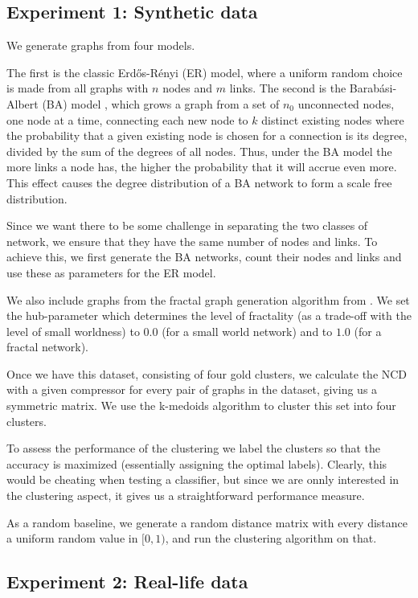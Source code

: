 \documentclass{article}
\begin{document}
\subsection*{Experiment 1: Synthetic data}

We generate graphs from four models. 

The first is the classic Erd\H{o}s-R\'enyi (ER) model, where a uniform random choice is made from all graphs with $n$ nodes and $m$ links. The second is the Barab\'asi-Albert (BA) model \cite{albert2002statistical}, which grows a graph from a set of $n_0$ unconnected nodes, one node at a time, connecting each new node to $k$ distinct existing nodes where the probability that a given existing node is chosen for a connection is its degree, divided by the sum of the degrees of all nodes. Thus, under the BA model the more links a node has, the higher the probability that it will accrue even more. This effect causes the degree distribution of a BA network to form a scale free distribution.

Since we want there to be some challenge in separating the two classes of network, we ensure that they have the same number of nodes and links. To achieve this, we first generate the BA networks, count their nodes and links and use these as parameters for the ER model.
 
We also include graphs from the fractal graph generation algorithm from \cite{song2006origins}. We set the hub-parameter which determines the level of fractality (as a trade-off with the level of small worldness) to $0.0$ (for a small world network) and to $1.0$ (for a fractal network).

Once we have this dataset, consisting of four gold clusters, we calculate the NCD with a given compressor for every pair of graphs in the dataset, giving us a symmetric matrix. We use the k-medoids algorithm to cluster this set into four clusters. 

To assess the performance of the clustering we label the clusters so that the accuracy is maximized (essentially assigning the optimal labels). Clearly, this would be cheating when testing a classifier, but since we are onnly interested in the clustering aspect, it gives us a straightforward performance measure.

As a random baseline, we generate a random distance matrix with every distance a uniform random value in $[0, 1)$, and run the clustering algorithm on that.

\subsection*{Experiment 2: Real-life data} 
\end{document}
